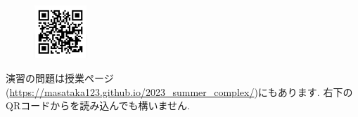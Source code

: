 \documentclass[dvipdfmx,a4paper,11pt]{article}
\newcommand{\C}{\mathbb{C}}
\theoremstyle{definition}
\begin{document}
\begin{enumerate}[label=\textbf{問}8.\arabic*]
  
 
 
 
 
 
 
  \end{enumerate} 
 
 \vspace{11pt}\begin{figure}  \centering\includegraphics[height=20mm, width=20mm]{complex.png}\end{figure}

演習の問題は授業ページ(\url{https://masataka123.github.io/2023_summer_complex/})にもあります. 右下のQRコードからを読み込んでも構いません.


  
  
 
\end{document}
